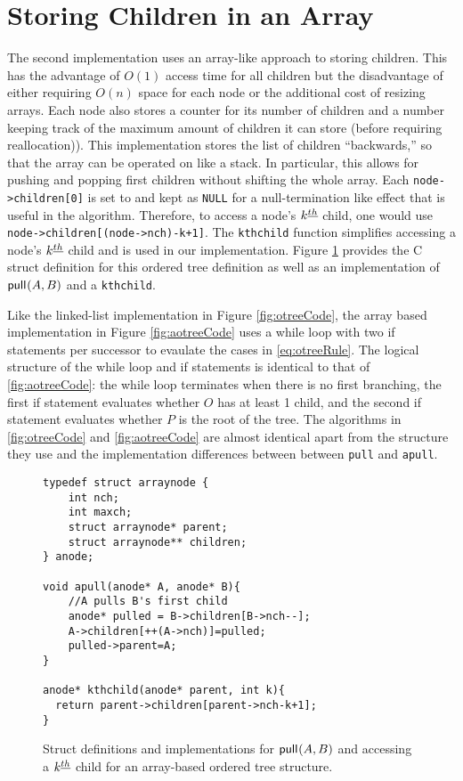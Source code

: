 \section{Storing Children in an Array}\label{sec:otree-arr}
The second implementation uses an array-like approach to storing children.  This has the advantage of $O(1)$ access time for all children but the disadvantage of either requiring $O(n)$ space for each node or the additional cost of resizing arrays.  Each node also stores a counter for its number of children and a number keeping track of the maximum amount of children it can store (before requiring reallocation)).  This implementation stores the list of children ``backwards,'' so that the array can be operated on like a stack.  In particular, this allows for pushing and popping first children without shifting the whole array. Each \verb+node->children[0]+ is set to and kept as \verb+NULL+ for a null-termination like effect that is useful in the algorithm. Therefore, to access a node's $k^{\underline{th}}$ child, one would use \verb_node->children[(node->nch)-k+1]_.  The \verb+kthchild+ function simplifies accessing a node's $k^{\underline{th}}$ child and is used in our implementation.  Figure \ref{fig:otreestarter-arr} provides the C struct definition for this ordered tree definition as well as an implementation of $\mathsf{pull}_{}(A,B)$ and a \verb+kthchild+. 

    Like the linked-list implementation in Figure \ref{fig:otreeCode}, the array based implementation in Figure \ref{fig:aotreeCode} uses a while loop with two if statements per successor to evaulate the cases in \eqref{eq:otreeRule}.  The logical structure of the while loop and if statements is identical to that of \ref{fig:aotreeCode}: the while loop terminates when there is no first branching, the first if statement evaluates whether $O$ has at least 1 child, and the second if statement evaluates whether $P$ is the root of the tree.  The algorithms in \ref{fig:otreeCode} and \ref{fig:aotreeCode} are almost identical apart from the structure they use and the implementation differences between between \verb+pull+ and \verb+apull+.

    \begin{figure}
	\begin{center}

	    \begin{Verbatim}
typedef struct arraynode {
    int nch; 
    int maxch;
    struct arraynode* parent;
    struct arraynode** children;
} anode;

void apull(anode* A, anode* B){ 
    //A pulls B's first child
    anode* pulled = B->children[B->nch--];
    A->children[++(A->nch)]=pulled;
    pulled->parent=A;
}

anode* kthchild(anode* parent, int k){
  return parent->children[parent->nch-k+1];
}
	    \end{Verbatim}
	\end{center}

    \cprotect\caption{Struct definitions and implementations for $\mathsf{pull}_{}(A,B)$ and accessing a $k^{\underline{th}}$ child for an array-based ordered tree structure.}
    \label{fig:otreestarter-arr}
\end{figure}

